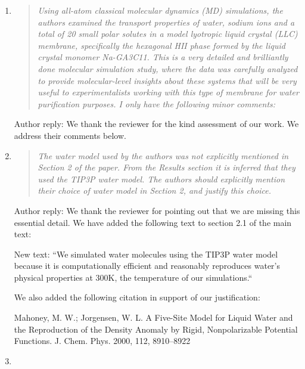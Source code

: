 \documentclass{article}
\begin{document}
\begin{enumerate}
	
	\item \begin{quote} \textit{Using all-atom classical molecular dynamics (MD) simulations,
	the authors examined the transport properties of water, sodium ions and a total of 20 
	small polar solutes in a model lyotropic liquid crystal (LLC) membrane, specifically the
	hexagonal HII phase formed by the liquid crystal monomer Na-GA3C11. This is a very 
	detailed and brilliantly done molecular simulation study, where the data was carefully 
	analyzed to provide molecular-level insights about these systems that will be very 
	useful to experimentalists working with this type of membrane for water purification 
	purposes. I only have the following minor comments: }\end{quote}
	
	Author reply: We thank the reviewer for the kind assessment of our work. We address their
	comments below.
	
	\item \begin{quote}
	
	\textit{The water model used by the authors was not explicitly mentioned in Section 2 
	of the paper. From the Results section it is inferred that they used the TIP3P water model.
	The authors should explicitly mention their choice of water model in Section 2, and 
	justify this choice.}
	
	\end{quote}
	
	Author reply: We thank the reviewer for pointing out that we are missing this essential detail.
	We have added the following text to section 2.1 of the main text:
	
	New text: ``We simulated water molecules using the TIP3P water model because it is 
    computationally efficient and reasonably reproduces water's physical properties
    at 300K, the temperature of our simulations.``
  
  	We also added the following citation in support of our justification:
  	
  	Mahoney, M. W.; Jorgensen, W. L. A Five-Site Model for Liquid Water and the Reproduction
  	of the Density Anomaly by Rigid, Nonpolarizable Potential Functions. J. Chem. Phys. 2000, 
  	112, 8910–8922
    
    \item \begin{quote}
    

\end{quote}
\end{enumerate}
\end{document}
